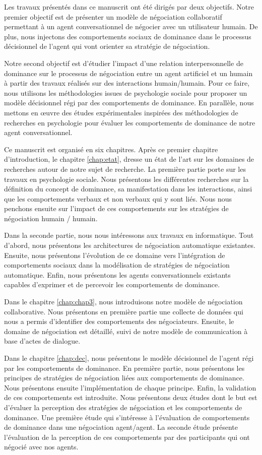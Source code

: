 Les travaux présentés dans ce manuscrit ont été dirigés
par deux objectifs. 
Notre premier objectif est de présenter un modèle de négociation collaboratif permettant à un agent conversationnel de négocier avec un utilisateur humain. De plus, nous injectons des comportements sociaux de dominance dans le processus décisionnel de l'agent qui vont orienter sa stratégie de négociation.

Notre second objectif est d'étudier l'impact d'une relation interpersonnelle de dominance sur le processus de négociation entre un agent artificiel et un humain à partir des travaux réalisés sur des interactions humain/humain.
Pour ce faire, nous utilisons les méthodologies issues de psychologie sociale pour proposer un modèle décisionnel régi par des comportements de dominance. En parallèle, nous mettons en œuvre des études expérimentales inspirées des méthodologies de recherches en psychologie pour évaluer les comportements de dominance de notre agent conversationnel.  

Ce manuscrit est organisé en six chapitres.
Après ce premier chapitre d'introduction, le chapitre \ref{chap:etat}, dresse un état de l'art sur les domaines de recherches autour de notre sujet de recherche. La première partie porte sur les travaux en psychologie sociale. Nous présentons les différentes recherches sur la définition du concept de dominance, sa manifestation dans les interactions, ainsi que les comportements verbaux et non verbaux qui y sont liés. Nous nous penchons ensuite sur l'impact de ces comportements sur les stratégies de négociation humain / humain. 

Dans la seconde partie, nous nous intéressons aux travaux en informatique. Tout d'abord, nous présentons les architectures de négociation automatique existantes. Ensuite, nous présentons l'évolution de ce domaine vers l'intégration de comportements sociaux dans la modélisation de stratégies de négociation automatique. Enfin, nous présentons les agents conversationnels existants capables d'exprimer et de percevoir les comportements de dominance. 

Dans le chapitre \ref{chap:chap3}, nous introduisons notre modèle de négociation collaborative. Nous présentons en première partie une collecte de données qui nous a permis d'identifier des comportements des négociateurs. Ensuite, le domaine de négociation est détaillé, suivi de notre modèle de communication à base d'actes de dialogue. 

Dans le chapitre \ref{chap:dec}, nous présentons le modèle décisionnel de l'agent régi par les comportements de dominance. En première partie, nous présentons les principes de stratégies de négociation liées aux comportements de dominance. Nous présentons ensuite l'implémentation de chaque principe. Enfin, la validation de ces comportements est introduite. Nous présentons deux études dont le but est d'évaluer la perception des stratégies de négociation et les comportements de dominance. Une première étude qui s'intéresse à l'évaluation de comportements de dominance dans une négociation agent/agent. La seconde étude présente l'évaluation  de la perception de ces comportements par des participants qui ont négocié avec nos agents.


